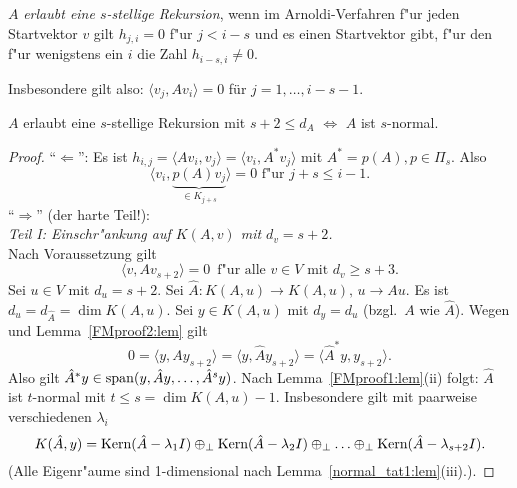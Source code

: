\begin{defn} $A$ {\em erlaubt eine $s$-stellige Rekursion}, wenn im
Arnoldi-Verfahren f"ur jeden Startvektor $v$ gilt $h_{j,i} = 0$ f"ur
$j < i-s$ und es einen Startvektor gibt, f"ur den f"ur wenigstens
ein $i$ die Zahl $h_{i-s,i} \neq 0$. 
\end{defn}

Insbesondere gilt also: $\langle v_j, Av_i\rangle = 0$ f\"ur $j=1,\ldots,i-s-1$.

\begin{sa} 
\label{faber:sa}
$A$ erlaubt eine $s$-stellige Rekursion mit $s+2 \leq d_A$
 $\Longleftrightarrow$ $A$ ist $s$-normal. 
\end{sa}
\begin{proof}
"`$\Leftarrow$"': Es ist $h_{i,j} = \langle Av_i,v_j \rangle = \langle v_i, A^*v_j \rangle$
mit $A^* = p(A), p \in \Pi_s$. Also
\[
\langle v_i, \underbrace{p(A)v_j}_{\in K_{j+s}} \rangle = 0 \mbox{ f"ur } j+s \leq i-1.
\]
"`$\Rightarrow$"' (der harte Teil!): \\
{\em Teil I: Einschr"ankung auf $K(A,v)$ mit $d_v = s+2$.}\\
Nach Voraussetzung gilt
\begin{equation} \label{FMproof:eq}
\langle v, Av_{s+2} \rangle = 0 \enspace \mbox{f"ur alle } v \in V \mbox{ mit } d_v \geq s+3.
\end{equation}
Sei $u \in V$ mit $d_u = s+2$. Sei $\hat{A}: K(A,u) \to K(A,u), \, u \to Au$. Es
ist $d_u = d_{\hat{A}} = \dim K(A,u)$. Sei $y \in K(A,u)$ mit $d_y = d_u$
(bzgl.\ $A$ wie $\hat{A}$). Wegen  und Lemma~\ref{FMproof2:lem}
gilt
\[
0 = \langle y, Ay_{s+2} \rangle =  \langle y, \hat{A}y_{s+2} \rangle = 
\langle \hat{A}^*y, y_{s+2} \rangle .
\]
Also gilt $\hat{A}^*y \in \operatorname{span}(y,\hat{A}y,\ldots,\hat{A}^s y)$. Nach Lemma~\ref{FMproof1:lem}(ii)
folgt: $\hat{A}$ ist $t$-normal mit $t \leq s = \dim K(A,u) -1$. Insbesondere gilt mit paarweise
verschiedenen $\lambda_i$
\[
  K(\hat{A},y) = \mbox{Kern}(\hat{A}-\lambda_1 I) \oplus_\perp \mbox{Kern}(\hat{A}-\lambda_2 I) \oplus_\perp 
         \ldots \oplus_\perp \mbox{Kern}(\hat{A}-\lambda_{s+2} I).
\]
(Alle Eigenr"aume sind 1-dimensional nach Lemma~\ref{normal_tat1:lem}(iii).).
\smallskip


\end{proof}
